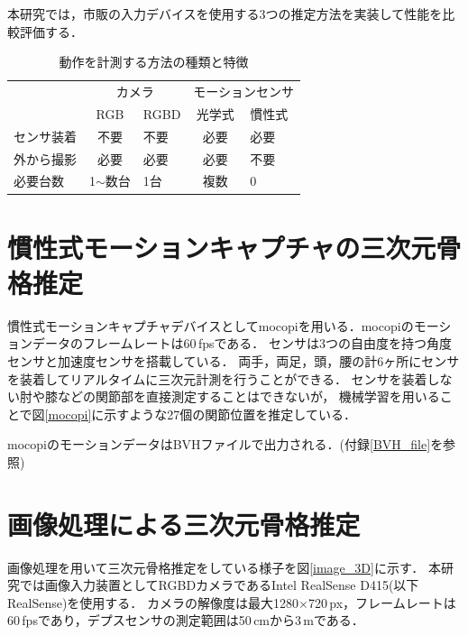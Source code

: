 \documentclass[a4j, fleqn, 12pt]{jsreport}
\begin{document}
本研究では，市販の入力デバイスを使用する3つの推定方法を実装して性能を比較評価する．
\begin{table}[b!]
  \centering
  \caption{動作を計測する方法の種類と特徴}
  \begin{tabular}{l|ll|ll}
    \hline
                  & \multicolumn{2}{c|}{\small{カメラ}}       & \multicolumn{2}{c}{\small{モーションセンサ}}                                                  \\ \cline{2-5}
                  & \multicolumn{1}{c|}{\small{RGB}}       & \small{RGBD}                         & \multicolumn{1}{c|}{\small{光学式}} & \small{慣性式} \\ \hline
    \small{センサ装着} & \multicolumn{1}{c|}{\small{不要}}        & \small{不要}                           & \multicolumn{1}{c|}{\small{必要}}  & \small{必要}  \\
    \small{外から撮影} & \multicolumn{1}{c|}{\small{必要}}        & \small{必要}                           & \multicolumn{1}{c|}{\small{必要}}  & \small{不要}  \\
    \small{必要台数}  & \multicolumn{1}{c|}{\small{1$\sim$数台}} & \small{1台}                           & \multicolumn{1}{c|}{\small{複数}}  & \small{0}   \\ \hline
  \end{tabular}
  \label{3D_1}
\end{table}
\section{慣性式モーションキャプチャの三次元骨格推定}\label{motion}
慣性式モーションキャプチャデバイスとしてmocopi\cite{mocopi}を用いる．mocopiのモーションデータのフレームレートは60\,fpsである．
センサは3つの自由度を持つ角度センサと加速度センサを搭載している．
両手，両足，頭，腰の計6ヶ所にセンサを装着してリアルタイムに三次元計測を行うことができる．
センサを装着しない肘や膝などの関節部を直接測定することはできないが，
機械学習を用いることで図\ref{mocopi}に示すような27個の関節位置を推定している．

mocopiのモーションデータはBVHファイルで出力される．(付録\ref{BVH_file}を参照)

\section{画像処理による三次元骨格推定}\label{3Dskeleton}
画像処理を用いて三次元骨格推定をしている様子を図\ref{image_3D}に示す．
本研究では画像入力装置としてRGBDカメラであるIntel RealSense D415(以下RealSense)を使用する．
カメラの解像度は最大1280$\times$720\,px，フレームレートは60\,fpsであり，デプスセンサの測定範囲は50\,cmから3\,mである．
\end{document}

